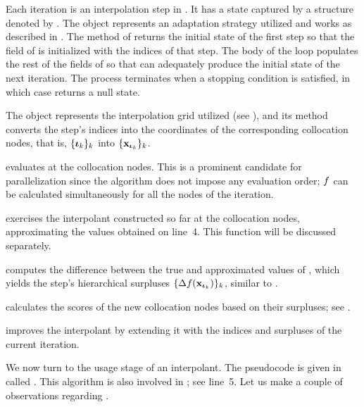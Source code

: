 \begin{compactlist}

 Each iteration is an interpolation step in .
It has a state captured by a structure denoted by . The
 object represents an adaptation strategy utilized and works as
described in . The  method of 
returns the initial state of the first step so that the  field of
 is initialized with the indices of that step. The body of the loop
populates the rest of the fields of  so that  can
adequately produce the initial state of the next iteration. The process
terminates when a stopping condition is satisfied, in which case 
returns a null state.

 The  object represents the interpolation grid
utilized (see ), and its  method converts the step's
indices into the coordinates of the corresponding collocation nodes, that is,
$\{ {\bm{\iota}}_k \}_k$ into $\{ \mathbf{x}_{{\bm{\iota}}_k} \}_k$.

  evaluates  at the collocation
nodes. This is a prominent candidate for parallelization since the algorithm
does not impose any evaluation order; $f$ can be calculated simultaneously for
all the nodes of the iteration.

  exercises the interpolant constructed so far at
the collocation nodes, approximating the values obtained on line~4. This
function will be discussed separately.

  computes the difference between the true and
approximated values of , which yields the step's hierarchical
surpluses $\{ \Delta f(\mathbf{x}_{{\bm{\iota}}_k}) \}_k$, similar to .

  calculates the scores of the new
collocation nodes based on their surpluses; see .

  improves the interpolant by extending it with the
indices and surpluses of the current iteration.

\end{compactlist}

We now turn to the usage stage of an interpolant. The pseudocode is given in
 called . This algorithm is also involved in
; see line~5. Let us make a couple of observations regarding
.


